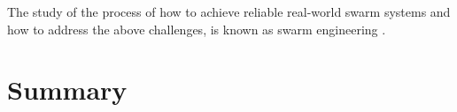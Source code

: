 The study of the process of how to achieve reliable real-world swarm systems and how to address the above challenges, is known as swarm engineering \cite{brambilla2013swarm}. %

\section{Summary}
\label{sec:first:summary}



